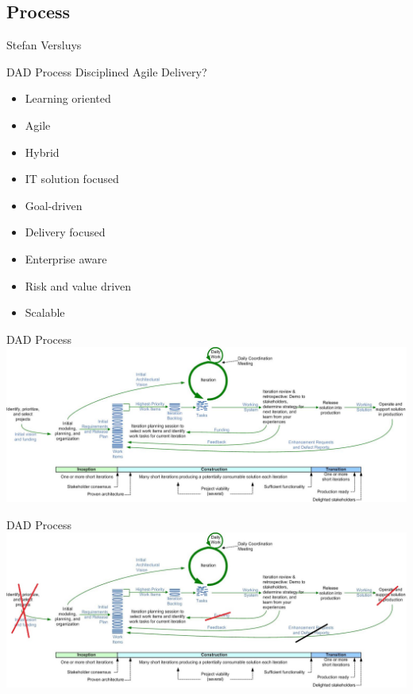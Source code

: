 \begin{frame}
    \section{Process}
    Stefan Versluys
\end{frame}

\begin{frame}[label=process1]{DAD Process}
	Disciplined Agile Delivery?
   \begin{itemize}
		\item Learning oriented
		\item Agile
		\item Hybrid
		\item IT solution focused
		\item Goal-driven
		\item Delivery focused
		\item Enterprise aware
		\item Risk and value driven
		\item Scalable
	\end{itemize}
\end{frame}

\begin{frame}[label=process2]{DAD Process}
    \includegraphics[width = .9\textwidth]{dadLifecycleUP2}
\end{frame}


\begin{frame}[label=process3]{DAD Process}
    \includegraphics[width = .9\textwidth]{dadLifecycleUP2s}
\end{frame}


